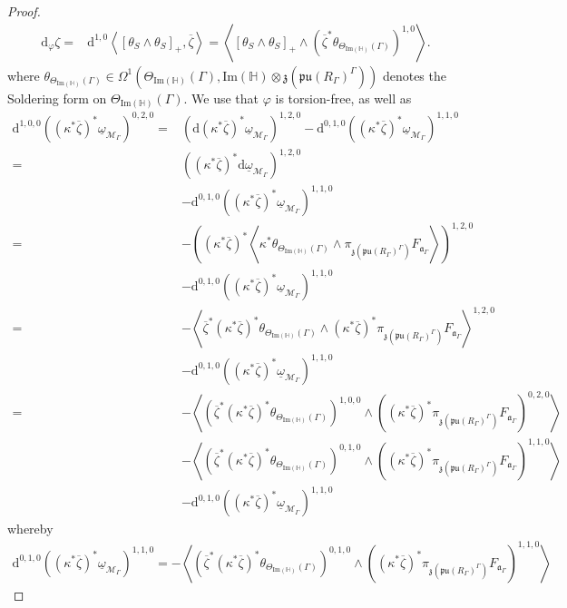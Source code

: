 \documentclass[10pt,a4paper]{amsart}
\newcommand{\m}[1]{{\mathrm{#1}}}
\begin{document}
\begin{proof}
\begin{align*}
    \m{d}_{\varphi}\zeta=&\m{d}^{1,0}\left<\left[\theta_{S}\wedge\theta_S\right]_+,\overline{\zeta}\right>=\left<\left[\theta_{S}\wedge\theta_S\right]_+\wedge(\overline{\zeta}^*\theta_{\Theta_{\m{Im}(\mathbb{H})}(\Gamma)})^{1,0}\right>.
\end{align*}
where $\theta_{\Theta_{\m{Im}(\mathbb{H})}(\Gamma)}\in \Omega^1(\Theta_{\m{Im}(\mathbb{H})}(\Gamma),\m{Im}(\mathbb{H})\otimes \mathfrak{z}(\mathfrak{pu}(R_\Gamma)^{\Gamma}))$ denotes the Soldering form on $\Theta_{\m{Im}(\mathbb{H})}(\Gamma)$. We use that $\varphi$ is torsion-free, as well as
\begin{align*}
    \m{d}^{1,0,0}((\kappa^*\overline{\zeta})^*\underline{\omega}_{\mathcal{M}_\Gamma})^{0,2,0}=&(\m{d}(\kappa^*\overline{\zeta})^*\underline{\omega}_{\mathcal{M}_\Gamma})^{1,2,0}-\m{d}^{0,1,0}((\kappa^*\overline{\zeta})^*\underline{\omega}_{\mathcal{M}_\Gamma})^{1,1,0}\\
    =&((\kappa^*\overline{\zeta})^*\m{d}\underline{\omega}_{\mathcal{M}_\Gamma})^{1,2,0}\\
    &-\m{d}^{0,1,0}((\kappa^*\overline{\zeta})^*\underline{\omega}_{\mathcal{M}_\Gamma})^{1,1,0}\\
    =&-\left((\kappa^*\overline{\zeta})^*\left<\kappa^*\theta_{\Theta_{\m{Im}(\mathbb{H})}(\Gamma)}\wedge\pi_{\mathfrak{z}(\mathfrak{pu}(R_\Gamma)^{\Gamma})}F_{\mathfrak{a}_\Gamma}\right>\right)^{1,2,0}\\
    &-\m{d}^{0,1,0}((\kappa^*\overline{\zeta})^*\underline{\omega}_{\mathcal{M}_\Gamma})^{1,1,0}\\
    =&-\left<\overline{\zeta}^*(\kappa^*\overline{\zeta})^*\theta_{\Theta_{\m{Im}(\mathbb{H})}(\Gamma)}\wedge(\kappa^*\overline{\zeta})^*\pi_{\mathfrak{z}(\mathfrak{pu}(R_\Gamma)^{\Gamma})}F_{\mathfrak{a}_\Gamma}\right>^{1,2,0}\\
    &-\m{d}^{0,1,0}((\kappa^*\overline{\zeta})^*\underline{\omega}_{\mathcal{M}_\Gamma})^{1,1,0}\\
    =&-\left<(\overline{\zeta}^*(\kappa^*\overline{\zeta})^*\theta_{\Theta_{\m{Im}(\mathbb{H})}(\Gamma)})^{1,0,0}\wedge((\kappa^*\overline{\zeta})^*\pi_{\mathfrak{z}(\mathfrak{pu}(R_\Gamma)^{\Gamma})}F_{\mathfrak{a}_\Gamma})^{0,2,0}\right>\\
    &-\left<(\overline{\zeta}^*(\kappa^*\overline{\zeta})^*\theta_{\Theta_{\m{Im}(\mathbb{H})}(\Gamma)})^{0,1,0}\wedge((\kappa^*\overline{\zeta})^*\pi_{\mathfrak{z}(\mathfrak{pu}(R_\Gamma)^{\Gamma})}F_{\mathfrak{a}_\Gamma})^{1,1,0}\right>\\
    &-\m{d}^{0,1,0}((\kappa^*\overline{\zeta})^*\underline{\omega}_{\mathcal{M}_\Gamma})^{1,1,0}
\end{align*}
whereby 
\begin{align*}
    \m{d}^{0,1,0}((\kappa^*\overline{\zeta})^*\underline{\omega}_{\mathcal{M}_\Gamma})^{1,1,0}=-\left<(\overline{\zeta}^*(\kappa^*\overline{\zeta})^*\theta_{\Theta_{\m{Im}(\mathbb{H})}(\Gamma)})^{0,1,0}\wedge((\kappa^*\overline{\zeta})^*\pi_{\mathfrak{z}(\mathfrak{pu}(R_\Gamma)^{\Gamma})}F_{\mathfrak{a}_\Gamma})^{1,1,0}\right>
\end{align*}


\end{proof}
\end{document}
